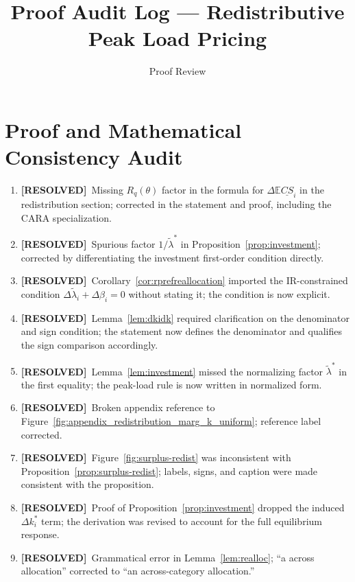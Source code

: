 \documentclass{class}
\title{Proof Audit Log --- Redistributive Peak Load Pricing}
\author{Proof Review}
\date{}
\newcommand{\ok}{\textcolor{ok}{\textbf{[RESOLVED]}}}
\begin{document}
\maketitle

\section*{Proof and Mathematical Consistency Audit}

\begin{enumerate}[leftmargin=1.5cm]

\item \ok\ Missing $R_q(\theta)$ factor in the formula for
$\Delta \mathbb{E}\underline{CS}_i$ in the redistribution section; corrected in the statement and proof, including the CARA specialization.

\item \ok\ Spurious factor $1/\tilde\lambda^\ast$ in Proposition~\ref{prop:investment}; corrected by differentiating the investment first-order condition directly.

\item \ok\ Corollary~\ref{cor:rprefreallocation} imported the IR-constrained condition
$\Delta\tilde\lambda_i+\Delta\beta_i=0$ without stating it; the condition is now explicit.

\item \ok\ Lemma~\ref{lem:dkidk} required clarification on the denominator and sign condition; the statement now defines the denominator and qualifies the sign comparison accordingly.

\item \ok\ Lemma~\ref{lem:investment} missed the normalizing factor $\tilde\lambda^\ast$ in the first equality; the peak-load rule is now written in normalized form.

\item \ok\ Broken appendix reference to Figure~\ref{fig:appendix_redistribution_marg_k_uniform}; reference label corrected.

\item \ok\ Figure~\ref{fig:surplus-redist} was inconsistent with Proposition~\ref{prop:surplus-redist}; labels, signs, and caption were made consistent with the proposition.

\item \ok\ Proof of Proposition~\ref{prop:investment} dropped the induced $\Delta k_i^\ast$ term; the derivation was revised to account for the full equilibrium response.

\item \ok\ Grammatical error in Lemma~\ref{lem:realloc}; ``a across allocation'' corrected to ``an across-category allocation.''


\end{enumerate}
\end{document}
